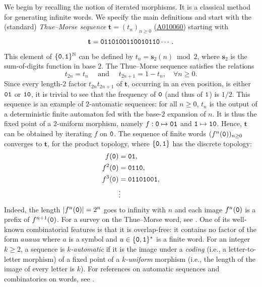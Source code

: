 \documentclass[12pt,reqno]{article}
\newcommand{\seqnum}[1]{\href{https://oeis.org/#1}{\rm \underline{#1}}}
\begin{document}
We begin by recalling the notion of iterated morphisms. 
It is a classical method for generating infinite words. We specify the main definitions and start with the (standard) {\em Thue--Morse sequence} $\mathbf{t}=(t_n)_{n\ge 0}$ (\seqnum{A010060}) starting with
\[
  \mathbf{t}={\tt 0110100110010110}\cdots.
\]
This element of $\{{\tt 0},{\tt 1}\}^\mathbb{N}$ can be defined by $t_n=\mathbf{s}_2(n)\bmod{2}$,  where $\mathbf{s}_2$ is the sum-of-digits function in base $2$.  The Thue--Morse sequence satisfies the relations
\begin{equation}
  \label{eq:tmbase2}
  t_{2n}=t_n \quad\text{ and }\quad t_{2n+1}=1-t_n,\quad \forall n\ge 0.
\end{equation}
 Since every length-$2$ factor $t_{2n}t_{2n+1}$ of $\mathbf{t}$, occurring in an even position, is either ${\tt 01}$ or ${\tt 10}$, it is trivial to see that the frequency of ${\tt 0}$ (and thus  of ${\tt 1}$) is $1/2$. This sequence is an example of $2$-automatic sequences: for all $n\ge 0$, $t_n$ is the output of a deterministic finite automaton fed with the base-$2$ expansion of $n$. It is thus the fixed point of a $2$-uniform morphism,  namely $f:{\tt 0}\mapsto {\tt 01}$ and ${\tt 1}\mapsto {\tt 10}$. Hence,  $\mathbf{t}$ can be obtained by iterating $f$ on ${\tt 0}$. The sequence of finite words $(f^n({\tt 0}))_{n\ge 0}$ converges to $\mathbf{t}$, for the product topology, where $\{{\tt 0},{\tt 1}\}$ has the discrete topology:
  \begin{align*}
    f({\tt 0})&={\tt 01},\\
    f^2({\tt 0})&={\tt 0110},\\
    f^3({\tt 0})&={\tt 01101001},\\
    &\vdots  
  \end{align*}
Indeed, the length $|f^n({\tt 0})|=2^n$ goes to infinity with $n$ and each image $f^n({\tt 0})$ is a prefix of $f^{n+1}({\tt 0})$. For a survey on the Thue--Morse word, see \cite{ubi}. One of its well-known combinatorial features is that it is overlap-free: it contains no factor of the form $auaua$ where $a$ is a symbol and $u\in\{{\tt 0},{\tt 1}\}^*$ is a finite word. For an integer $k\ge 2$,  a sequence is \emph{$k$-automatic} if it is the image under a \emph{coding} (i.e., a letter-to-letter morphism) of a fixed point of a \emph{$k$-uniform} morphism (i.e.,  the length of the image of every letter is $k$).
For references on automatic sequences and combinatorics on words, see \cite{AS,Lothaire2,Rigo_book}. 
\end{document}
